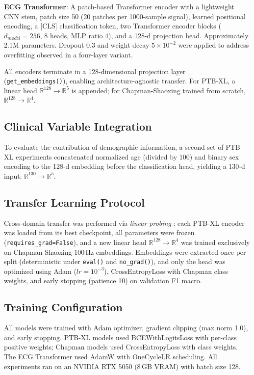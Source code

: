 \documentclass[journal]{IEEEtran}
\begin{document}
\textbf{ECG Transformer}: A patch-based Transformer encoder \cite{islam2024ecgformer} with a lightweight CNN stem, patch size 50 (20 patches per 1000-sample signal), learned positional encoding, a [CLS] classification token, two Transformer encoder blocks \cite{vaswani2017attention} ($d_{model}=256$, 8 heads, MLP ratio 4), and a 128-d projection head. Approximately 2.1M parameters. Dropout 0.3 and weight decay $5\times10^{-2}$ were applied to address overfitting observed in a four-layer variant.

All encoders terminate in a 128-dimensional projection layer (\texttt{get\_embeddings()}), enabling architecture-agnostic transfer. For PTB-XL, a linear head $\mathbb{R}^{128} \to \mathbb{R}^{5}$ is appended; for Chapman-Shaoxing trained from scratch, $\mathbb{R}^{128} \to \mathbb{R}^{4}$.

\subsection{Clinical Variable Integration}

To evaluate the contribution of demographic information, a second set of PTB-XL experiments concatenated normalized age (divided by 100) and binary sex encoding to the 128-d embedding before the classification head, yielding a 130-d input: $\mathbb{R}^{130} \to \mathbb{R}^{5}$.

\subsection{Transfer Learning Protocol}

Cross-domain transfer was performed via \textit{linear probing} \cite{chen2024patchecg}: each PTB-XL encoder was loaded from its best checkpoint, all parameters were frozen (\texttt{requires\_grad=False}), and a new linear head $\mathbb{R}^{128} \to \mathbb{R}^{4}$ was trained exclusively on Chapman-Shaoxing 100\,Hz embeddings. Embeddings were extracted once per split (deterministic under \texttt{eval()} and \texttt{no\_grad()}), and only the head was optimized using Adam ($lr=10^{-3}$), CrossEntropyLoss with Chapman class weights, and early stopping (patience 10) on validation F1 macro.

\subsection{Training Configuration}

All models were trained with Adam optimizer, gradient clipping (max norm 1.0), and early stopping. PTB-XL models used BCEWithLogitsLoss with per-class positive weights; Chapman models used CrossEntropyLoss with class weights. The ECG Transformer used AdamW with OneCycleLR scheduling. All experiments ran on an NVIDIA RTX 5050 (8\,GB VRAM) with batch size 128.
\end{document}
